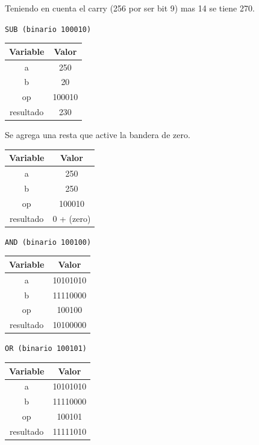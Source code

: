 \documentclass[letterpaper]{sae}
\begin{document}
\vspace{5 mm}

Teniendo en cuenta el carry (256 por ser bit 9) mas 14 se tiene 270.


\verb+SUB (binario 100010)+\\

\begin{center}
	\begin{tabular}{|c|c|}
		\hline 
		Variable & Valor\tabularnewline
		\hline 
		\hline 
		a & 250\tabularnewline
		\hline 
		b & 20\tabularnewline
		\hline 
		op & 100010\tabularnewline
		\hline 
		resultado & 230\tabularnewline
		\hline 
	\end{tabular}
\end{center}

\vspace{5 mm}

Se agrega una resta que active la bandera de zero.

\vspace{5 mm}

\begin{center}
	\begin{tabular}{|c|c|}
		\hline 
		Variable & Valor\tabularnewline
		\hline 
		\hline 
		a & 250\tabularnewline
		\hline 
		b & 250\tabularnewline
		\hline 
		op & 100010\tabularnewline
		\hline 
		resultado & 0 + (zero)\tabularnewline
		\hline 
	\end{tabular}
\end{center}

\vspace{5 mm}

\verb+AND (binario 100100)+\\

\begin{center}
	\begin{tabular}{|c|c|}
		\hline 
		Variable & Valor\tabularnewline
		\hline 
		\hline 
		a & 10101010\tabularnewline
		\hline 
		b & 11110000\tabularnewline
		\hline 
		op & 100100\tabularnewline
		\hline 
		resultado & 10100000\tabularnewline
		\hline 
	\end{tabular}
\end{center}

\vspace{5 mm}

\verb+OR (binario 100101)+\\

\begin{center}
	\begin{tabular}{|c|c|}
		\hline 
		Variable & Valor\tabularnewline
		\hline 
		\hline 
		a & 10101010\tabularnewline
		\hline 
		b & 11110000\tabularnewline
		\hline 
		op & 100101\tabularnewline
		\hline 
		resultado & 11111010\tabularnewline
		\hline 
	\end{tabular}
\end{center}
\end{document}

